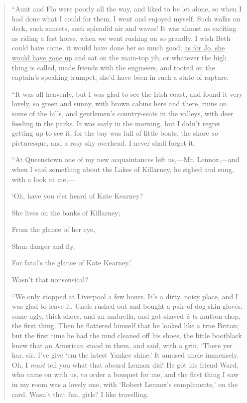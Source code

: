 \begin{quote}
``Aunt and Flo were poorly all the way, and liked to be let alone, so
when I had done what I could for them, I went and enjoyed myself. Such
walks on deck, such sunsets, such splendid air and waves! It was almost
as exciting as riding a fast horse, when we went rushing on so grandly.
I wish Beth could have come, it would have done her so much good; \underline{as
for Jo, she would have gone up} and sat on the main-top jib, or whatever
the high thing is called, made friends with the engineers, and tooted on
the captain's speaking-trumpet, she'd
have been in such a state of rapture.

``It was all heavenly, but I was glad to see the Irish coast, and found
it very lovely, so green and sunny, with brown cabins here and there,
ruins on some of the hills, and gentlemen's
country-seats in the valleys, with deer feeding in the parks. It was
early in the morning, but I didn't regret getting up to
see it, for the bay was full of little boats, the shore \emph{so}
picturesque, and a rosy sky overhead. I never shall forget it.

``At Queenstown one of my new acquaintances left us,---Mr. Lennox,---and
when I said something about the Lakes of Killarney, he sighed and sung,
with a look at me,---

`Oh, have you e'er heard of Kate
Kearney?

She lives on the banks of Killarney;

From the glance of her eye,

Shun danger and fly,

For fatal's the glance of Kate
Kearney.'

Wasn't that nonsensical?

``We only stopped at Liverpool a few hours. It's a dirty,
noisy place, and I was glad to leave it. Uncle rushed out and bought a
pair of dog-skin gloves, some ugly, thick shoes, and an umbrella, and
got shaved \emph{à la} mutton-chop, the first thing. Then he flattered
himself that he looked like a true Briton; but the first time he had the
mud cleaned off his shoes, the little bootblack knew that an American
stood in them, and said, with a grin, `There yer har,
sir. I've give `em the latest Yankee
shine.' It amused uncle immensely. Oh, I \emph{must}
tell you what that absurd Lennox did! He got his friend Ward, who came
on with us, to order a bouquet for me, and the first thing I saw in my
room was a lovely one, with `Robert
Lennox's compliments,' on the card.
Wasn't that fun, girls? I like travelling.


\end{quote}
